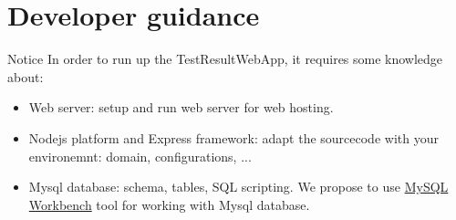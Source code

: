 \hypertarget{developer-guidance}{%
\section{Developer guidance}\label{developer-guidance}}

\begin{boxhint}{Notice}
In order to run up the TestResultWebApp, it requires some knowledge about:
\begin{itemize}
   \item Web server: setup and run web server for web hosting.
   \item Nodejs platform and Express framework: adapt the sourcecode with your
         environemnt: domain, configurations, ...
   \item Mysql database: schema, tables, SQL scripting. We propose to use
         \href{https://dev.mysql.com/doc/workbench/en/}{MySQL Workbench} tool
         for working with Mysql database.
\end{itemize}
\end{boxhint}

